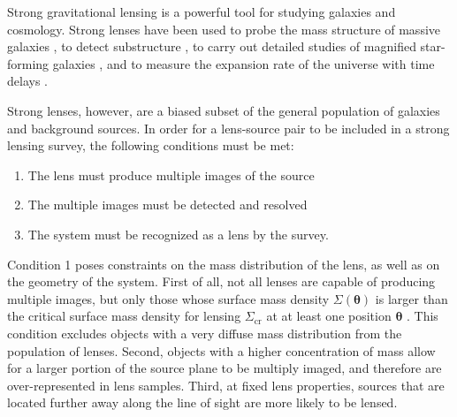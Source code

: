 \documentclass{aa}
\begin{document}
Strong gravitational lensing is a powerful tool for studying galaxies and cosmology.
Strong lenses have been used to probe the mass structure of massive galaxies \citep{Aug++10, ORF14, Son++15, Sha++21}, to detect substructure \citep{Veg++12, Hez++16, Nie++20}, to carry out detailed studies of magnified star-forming galaxies \citep{Jon++13}, and to measure the expansion rate of the universe with time delays \citep[see][ for a review]{T+M16}.

Strong lenses, however, are a biased subset of the general population of galaxies and background sources.
In order for a lens-source pair to be included in a strong lensing survey, the following conditions must be met:
\begin{enumerate}
\item The lens must produce multiple images of the source
\item The multiple images must be detected and resolved
\item The system must be recognized as a lens by the survey.
\end{enumerate}
Condition 1 poses constraints on the mass distribution of the lens, as well as on the geometry of the system. 
First of all, not all lenses are capable of producing multiple images, but only those whose surface mass density $\Sigma(\boldsymbol\theta)$ is larger than the critical surface mass density for lensing $\Sigma_{\mathrm{cr}}$ at at least one position $\boldsymbol\theta$ \citep{SEF92}.
This condition excludes objects with a very diffuse mass distribution from the population of lenses.
Second, objects with a higher concentration of mass allow for a larger portion of the source plane to be multiply imaged, and therefore are over-represented in lens samples. Third, at fixed lens properties, sources that are located further away along the line of sight are more likely to be lensed.

\end{document}
